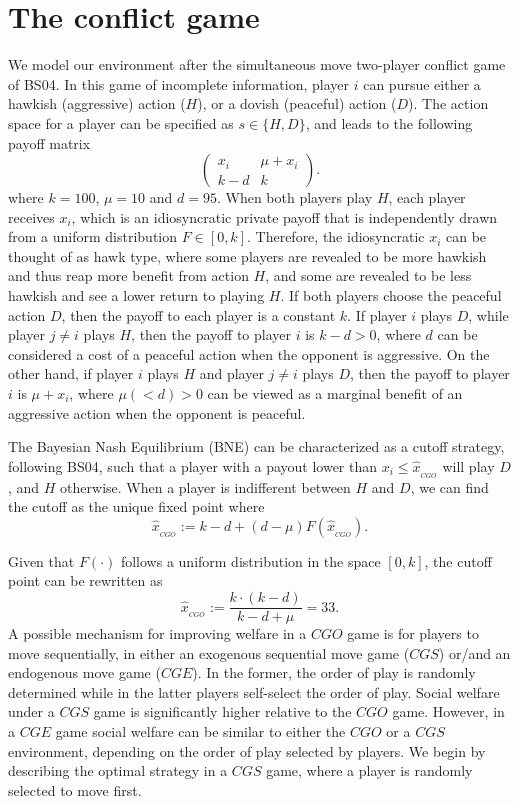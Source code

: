\documentclass[11pt, letterpaper]{article}
\theoremstyle{plain}
\begin{document}
\section{The conflict game}
\label{sec:model}
We model our environment after the simultaneous move two-player conflict game of BS04. In this game of incomplete information, player $i$ can pursue either a hawkish (aggressive) action ($H$), or a dovish (peaceful) action ($D$). The action space for a player can be specified as $s\in\{H,D\}$, and leads to the following payoff matrix
\begin{equation}
\begin{pmatrix}
x_i & \mu+x_i \\
k-d & k 
\label{t:payoff}
\end{pmatrix}.
\end{equation}
where $k=100$, $\mu=10$ and $d=95$. When both players play $H$, each player receives $x_i$, which is an idiosyncratic private payoff that is independently drawn from a uniform distribution $F\in [0,k]$. Therefore, the idiosyncratic $x_i$ can be thought of as hawk type, where some players are revealed to be more hawkish and thus reap more benefit from action $H$, and some are revealed to be less hawkish and see a lower return to playing $H$. If both players choose the peaceful action $D$, then the payoff to each player is a constant $k$. If player $i$ plays $D$, while player $j\neq i$ plays $H$, then the payoff to player $i$ is $k-d>0$, where $d$ can be considered a cost of a peaceful action when the opponent is aggressive. On the other hand, if player $i$ plays $H$ and player $j\neq i$ plays $D$, then the payoff to player $i$ is $\mu+x_i$, where $\mu (<d)>0$ can be viewed as a marginal benefit of an aggressive action when the opponent is peaceful. 

The Bayesian Nash Equilibrium (BNE) can be characterized as a cutoff strategy, following BS04, such that a player with a payout lower than $x_i\leq\hat{x}_{_{CGO}}$ will play $D$, and $H$ otherwise.  When a player is indifferent between $H$ and $D$, we can find the cutoff as the unique fixed point where 
\begin{equation}
\hat{x}_{_{CGO}}:= k-d + (d-\mu) F(\hat{x}_{_{CGO}}). \label{eq:cgo}
\end{equation}

\noindent Given that $F(\cdot)$ follows a uniform distribution in the space $[0,k]$, the cutoff point can be rewritten as 
\begin{equation}
\hat{x}_{_{CGO}}:= \frac{k\cdot (k-d)}{k-d+\mu}=33. \label{eq:cgosol}
\end{equation}
A possible mechanism for improving welfare in a $CGO$ game is for players to move sequentially, in either an exogenous sequential move game ($CGS$) or/and an endogenous move game ($CGE$). In the former, the order of play is randomly determined while in the latter players self-select the order of play. Social welfare under a $CGS$ game is significantly higher relative to the $CGO$ game. However, in a $CGE$ game social welfare can be similar to either the $CGO$ or a $CGS$ environment, depending on the order of play selected by players. We begin by describing the optimal strategy in a $CGS$ game, where a player is randomly selected to move first. 
\end{document}
